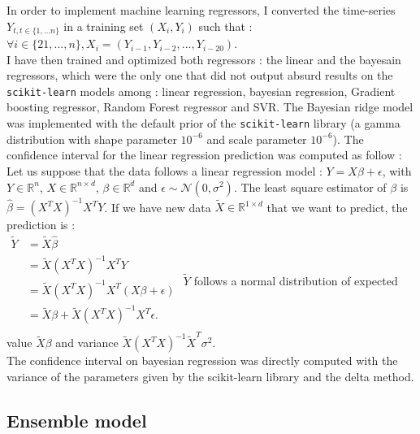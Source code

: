 In order to implement machine learning regressors, I converted the time-series $Y_{t,  t \in \{1, \hdots n\}}$ in a training set $(X_i, Y_i)$ such that : \\
$\forall i \in \{21, ..., n\}, X_i = (Y_{i-1}, Y_{i-2}, ..., Y_{i-20})$.\\

I have then trained and optimized both regressors : the linear and the bayesain regressors, which were the only one that did not output absurd results on the \texttt{scikit-learn} models among : linear regression, bayesian regression, Gradient boosting regressor, Random Forest regressor and SVR. 
The Bayesian ridge model was implemented with the default prior of the \texttt{scikit-learn} library (a gamma distribution with shape parameter $10^{-6}$ and scale parameter $10^{-6}$).
The confidence interval for the linear regression prediction was computed as follow : \\
Let us suppose that the data follows a linear regression model : $Y = X\beta + \epsilon$, with $Y \in \mathbb{R}^n$, $X \in \mathbb{R}^{n \times d}$, $\beta \in \mathbb{R}^d$ and $\epsilon \sim \mathcal{N}(0, \sigma^2)$.
The least square estimator of $\beta$ is $\hat{\beta} = (X^T X)^{-1} X^T Y$.
If we have new data $\tilde{X} \in \mathbb{R}^{1 \times d}$ that we want to predict, the prediction is  : \\

$
\begin{aligned}
    \tilde{Y} & = \tilde{X} \hat{\beta} \\
    &   = \tilde{X} (X^T X)^{-1} X^T Y \\
    &  = \tilde{X} (X^T X)^{-1} X^T (X\beta + \epsilon) \\
    &  = \tilde{X} \beta + \tilde{X} (X^T X)^{-1} X^T \epsilon.\\
\end{aligned}
$
\newline
$\tilde{Y}$ follows a normal distribution of expected value $\tilde{X} \beta$ and variance $\tilde{X} (X^T X)^{-1} \tilde{X}^T \sigma ^2$.\\
The confidence interval on bayesian regression was directly computed with the variance of the parameters given by the scikit-learn library and the delta method. 

\subsection{Ensemble model}

